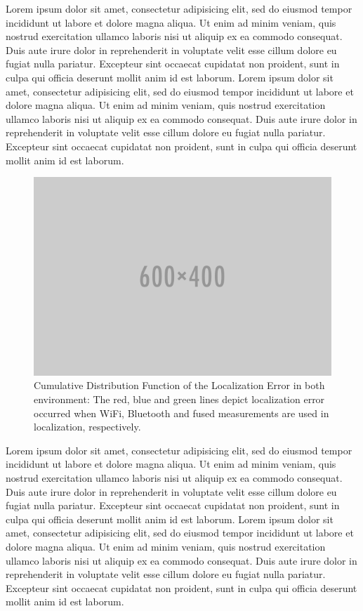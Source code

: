     Lorem ipsum dolor sit amet, consectetur adipisicing elit, sed do eiusmod tempor incididunt ut labore et dolore magna aliqua. Ut enim ad minim veniam, quis nostrud exercitation ullamco laboris nisi ut aliquip ex ea commodo consequat. Duis aute irure dolor in reprehenderit in voluptate velit esse cillum dolore eu fugiat nulla pariatur. Excepteur sint occaecat cupidatat non proident, sunt in culpa qui officia deserunt mollit anim id est laborum.
    Lorem ipsum dolor sit amet, consectetur adipisicing elit, sed do eiusmod tempor incididunt ut labore et dolore magna aliqua. Ut enim ad minim veniam, quis nostrud exercitation ullamco laboris nisi ut aliquip ex ea commodo consequat. Duis aute irure dolor in reprehenderit in voluptate velit esse cillum dolore eu fugiat nulla pariatur. Excepteur sint occaecat cupidatat non proident, sunt in culpa qui officia deserunt mollit anim id est laborum.

    \begin{figure}[thpb]
        \centering
        \includegraphics[width=\linewidth]{figures/placeholder.png}
        \caption{\label{fig:cdf}Cumulative Distribution Function of the Localization Error in both environment: The red, blue and green lines depict localization error occurred when WiFi, Bluetooth and fused measurements are used in localization, respectively.}
    \end{figure}
    Lorem ipsum dolor sit amet, consectetur adipisicing elit, sed do eiusmod tempor incididunt ut labore et dolore magna aliqua. Ut enim ad minim veniam, quis nostrud exercitation ullamco laboris nisi ut aliquip ex ea commodo consequat. Duis aute irure dolor in reprehenderit in voluptate velit esse cillum dolore eu fugiat nulla pariatur. Excepteur sint occaecat cupidatat non proident, sunt in culpa qui officia deserunt mollit anim id est laborum.
    Lorem ipsum dolor sit amet, consectetur adipisicing elit, sed do eiusmod tempor incididunt ut labore et dolore magna aliqua. Ut enim ad minim veniam, quis nostrud exercitation ullamco laboris nisi ut aliquip ex ea commodo consequat. Duis aute irure dolor in reprehenderit in voluptate velit esse cillum dolore eu fugiat nulla pariatur. Excepteur sint occaecat cupidatat non proident, sunt in culpa qui officia deserunt mollit anim id est laborum.
